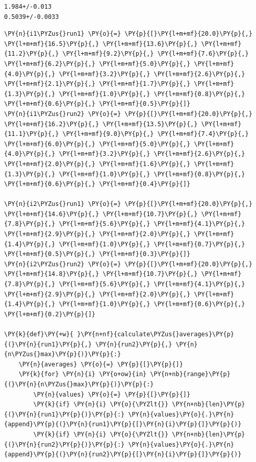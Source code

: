     \begin{Verbatim}[commandchars=\\\{\}]
1.984+/-0.013
0.5039+/-0.0033
    \end{Verbatim}

    \begin{tcolorbox}[breakable, size=fbox, boxrule=1pt, pad at break*=1mm,colback=cellbackground, colframe=cellborder]
\begin{Verbatim}[commandchars=\\\{\}]
\PY{n}{i1\PYZus{}run1} \PY{o}{=} \PY{p}{[}\PY{l+m+mf}{20.0}\PY{p}{,} \PY{l+m+mf}{16.5}\PY{p}{,} \PY{l+m+mf}{13.6}\PY{p}{,} \PY{l+m+mf}{11.2}\PY{p}{,} \PY{l+m+mf}{9.2}\PY{p}{,} \PY{l+m+mf}{7.6}\PY{p}{,} \PY{l+m+mf}{6.2}\PY{p}{,} \PY{l+m+mf}{5.0}\PY{p}{,} \PY{l+m+mf}{4.0}\PY{p}{,} \PY{l+m+mf}{3.2}\PY{p}{,} \PY{l+m+mf}{2.6}\PY{p}{,} \PY{l+m+mf}{2.1}\PY{p}{,} \PY{l+m+mf}{1.7}\PY{p}{,} \PY{l+m+mf}{1.3}\PY{p}{,} \PY{l+m+mf}{1.0}\PY{p}{,} \PY{l+m+mf}{0.8}\PY{p}{,} \PY{l+m+mf}{0.6}\PY{p}{,} \PY{l+m+mf}{0.5}\PY{p}{]}
\PY{n}{i1\PYZus{}run2} \PY{o}{=} \PY{p}{[}\PY{l+m+mf}{20.0}\PY{p}{,} \PY{l+m+mf}{16.2}\PY{p}{,} \PY{l+m+mf}{13.5}\PY{p}{,} \PY{l+m+mf}{11.1}\PY{p}{,} \PY{l+m+mf}{9.0}\PY{p}{,} \PY{l+m+mf}{7.4}\PY{p}{,} \PY{l+m+mf}{6.0}\PY{p}{,} \PY{l+m+mf}{5.0}\PY{p}{,} \PY{l+m+mf}{4.0}\PY{p}{,} \PY{l+m+mf}{3.2}\PY{p}{,} \PY{l+m+mf}{2.6}\PY{p}{,} \PY{l+m+mf}{2.0}\PY{p}{,} \PY{l+m+mf}{1.6}\PY{p}{,} \PY{l+m+mf}{1.3}\PY{p}{,} \PY{l+m+mf}{1.0}\PY{p}{,} \PY{l+m+mf}{0.8}\PY{p}{,} \PY{l+m+mf}{0.6}\PY{p}{,} \PY{l+m+mf}{0.4}\PY{p}{]}

\PY{n}{i2\PYZus{}run1} \PY{o}{=} \PY{p}{[}\PY{l+m+mf}{20.0}\PY{p}{,} \PY{l+m+mf}{14.6}\PY{p}{,} \PY{l+m+mf}{10.7}\PY{p}{,} \PY{l+m+mf}{7.8}\PY{p}{,} \PY{l+m+mf}{5.6}\PY{p}{,} \PY{l+m+mf}{4.1}\PY{p}{,} \PY{l+m+mf}{2.9}\PY{p}{,} \PY{l+m+mf}{2.0}\PY{p}{,} \PY{l+m+mf}{1.4}\PY{p}{,} \PY{l+m+mf}{1.0}\PY{p}{,} \PY{l+m+mf}{0.7}\PY{p}{,} \PY{l+m+mf}{0.5}\PY{p}{,} \PY{l+m+mf}{0.3}\PY{p}{]}
\PY{n}{i2\PYZus{}run2} \PY{o}{=} \PY{p}{[}\PY{l+m+mf}{20.0}\PY{p}{,} \PY{l+m+mf}{14.8}\PY{p}{,} \PY{l+m+mf}{10.7}\PY{p}{,} \PY{l+m+mf}{7.8}\PY{p}{,} \PY{l+m+mf}{5.6}\PY{p}{,} \PY{l+m+mf}{4.1}\PY{p}{,} \PY{l+m+mf}{2.9}\PY{p}{,} \PY{l+m+mf}{2.0}\PY{p}{,} \PY{l+m+mf}{1.4}\PY{p}{,} \PY{l+m+mf}{1.0}\PY{p}{,} \PY{l+m+mf}{0.6}\PY{p}{,} \PY{l+m+mf}{0.2}\PY{p}{]}

\PY{k}{def}\PY{+w}{ }\PY{n+nf}{calculate\PYZus{}averages}\PY{p}{(}\PY{n}{run1}\PY{p}{,} \PY{n}{run2}\PY{p}{,} \PY{n}{n\PYZus{}max}\PY{p}{)}\PY{p}{:}
    \PY{n}{averages} \PY{o}{=} \PY{p}{[}\PY{p}{]}
    \PY{k}{for} \PY{n}{i} \PY{o+ow}{in} \PY{n+nb}{range}\PY{p}{(}\PY{n}{n\PYZus{}max}\PY{p}{)}\PY{p}{:}
        \PY{n}{values} \PY{o}{=} \PY{p}{[}\PY{p}{]}
        \PY{k}{if} \PY{n}{i} \PY{o}{\PYZlt{}} \PY{n+nb}{len}\PY{p}{(}\PY{n}{run1}\PY{p}{)}\PY{p}{:} \PY{n}{values}\PY{o}{.}\PY{n}{append}\PY{p}{(}\PY{n}{run1}\PY{p}{[}\PY{n}{i}\PY{p}{]}\PY{p}{)}
        \PY{k}{if} \PY{n}{i} \PY{o}{\PYZlt{}} \PY{n+nb}{len}\PY{p}{(}\PY{n}{run2}\PY{p}{)}\PY{p}{:} \PY{n}{values}\PY{o}{.}\PY{n}{append}\PY{p}{(}\PY{n}{run2}\PY{p}{[}\PY{n}{i}\PY{p}{]}\PY{p}{)}
        

\end{Verbatim}
\end{tcolorbox}
